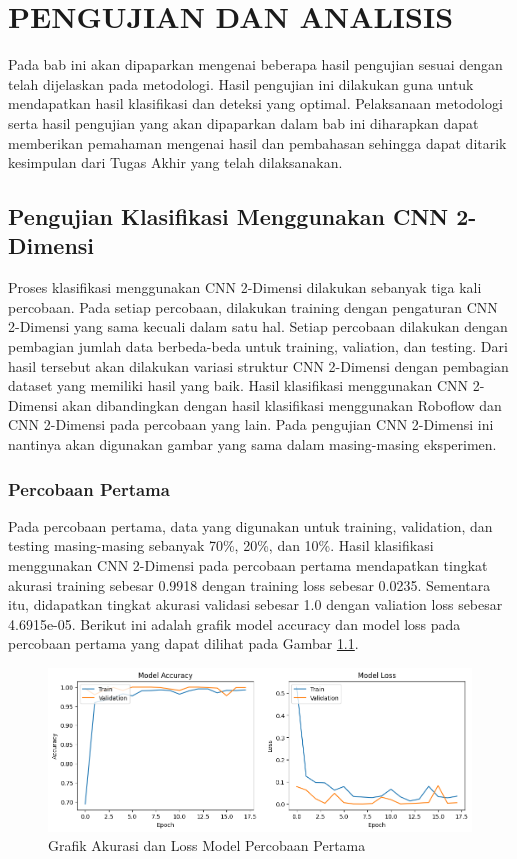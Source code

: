 \chapter{PENGUJIAN DAN ANALISIS}
\label{chap:pengujiananalisis}


Pada bab ini akan dipaparkan mengenai beberapa hasil pengujian sesuai dengan telah dijelaskan pada metodologi. Hasil pengujian ini dilakukan guna untuk mendapatkan hasil klasifikasi dan deteksi yang optimal. Pelaksanaan metodologi serta hasil pengujian yang akan dipaparkan dalam bab ini diharapkan dapat memberikan pemahaman mengenai hasil dan pembahasan sehingga dapat ditarik kesimpulan dari Tugas Akhir yang telah dilaksanakan.


\section{Pengujian Klasifikasi Menggunakan CNN 2-Dimensi}
\label{sec:PengujianCNN2D}
Proses klasifikasi menggunakan CNN 2-Dimensi dilakukan sebanyak tiga kali percobaan. Pada setiap percobaan, dilakukan training dengan pengaturan CNN 2-Dimensi yang sama kecuali dalam satu hal. Setiap percobaan dilakukan dengan pembagian jumlah data berbeda-beda untuk training, valiation, dan testing. Dari hasil tersebut akan dilakukan variasi struktur CNN 2-Dimensi dengan pembagian dataset yang memiliki hasil yang baik. Hasil klasifikasi menggunakan CNN 2-Dimensi akan dibandingkan dengan hasil klasifikasi menggunakan Roboflow dan CNN 2-Dimensi pada percobaan yang lain. Pada pengujian CNN 2-Dimensi ini nantinya akan digunakan gambar yang sama dalam masing-masing eksperimen.

\subsection{Percobaan Pertama}
Pada percobaan pertama, data yang digunakan untuk training, validation, dan testing masing-masing sebanyak 70\%, 20\%, dan 10\%. Hasil klasifikasi menggunakan CNN 2-Dimensi pada percobaan pertama mendapatkan tingkat akurasi training sebesar 0.9918 dengan training loss sebesar 0.0235. Sementara itu, didapatkan tingkat akurasi validasi sebesar 1.0 dengan valiation loss sebesar 4.6915e-05. Berikut ini adalah grafik model accuracy dan model loss pada percobaan pertama yang dapat dilihat pada Gambar \ref{fig:trainres1}.

\begin{figure} [H] \centering
    \includegraphics[scale=0.5]{gambar/bab4/trainres1.png}
    \caption{Grafik Akurasi dan Loss Model Percobaan Pertama}
    \label{fig:trainres1}
\end{figure}

